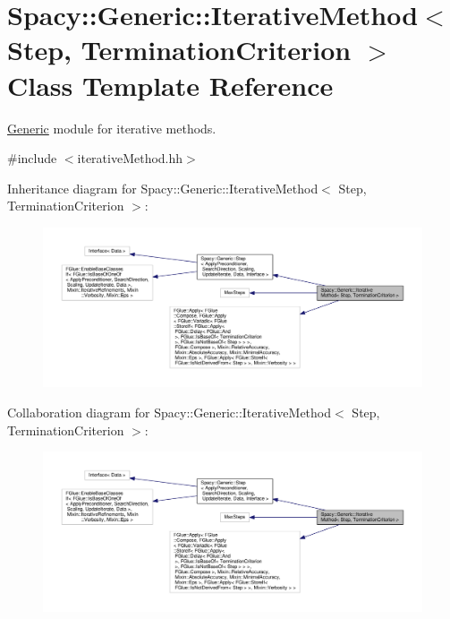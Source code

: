 \hypertarget{classSpacy_1_1Generic_1_1IterativeMethod}{}\section{Spacy\+:\+:Generic\+:\+:Iterative\+Method$<$ Step, Termination\+Criterion $>$ Class Template Reference}
\label{classSpacy_1_1Generic_1_1IterativeMethod}


\hyperlink{namespaceSpacy_1_1Generic}{Generic} module for iterative methods.  




{\ttfamily \#include $<$iterative\+Method.\+hh$>$}



Inheritance diagram for Spacy\+:\+:Generic\+:\+:Iterative\+Method$<$ Step, Termination\+Criterion $>$\+:
\nopagebreak
\begin{figure}[H]
\begin{center}
\leavevmode
\includegraphics[width=350pt]{classSpacy_1_1Generic_1_1IterativeMethod__inherit__graph}
\end{center}
\end{figure}


Collaboration diagram for Spacy\+:\+:Generic\+:\+:Iterative\+Method$<$ Step, Termination\+Criterion $>$\+:
\nopagebreak
\begin{figure}[H]
\begin{center}
\leavevmode
\includegraphics[width=350pt]{classSpacy_1_1Generic_1_1IterativeMethod__coll__graph}
\end{center}
\end{figure}
